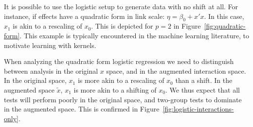 \documentclass[]{bio}
\begin{document}
It is possible to use the logistic setup to generate data with no shift at all. 
For instance, if effects have a quadratic form in link scale: $\eta=\beta_0+x'x$. 
In this case, $x_1$ is akin to a rescaling of $x_0$.
This is depicted for $p=2$ in Figure~\ref{fig:quadratic-form}.
This example is typically encountered in the machine learning literature, to motivate learning with kernels. 

When analyzing the quadratic form logistic regression we need to distinguish between analysis in the original $x$ space, and in the augmented interaction space. 
In the original space, $x_1$ is more akin to a rescaling of $x_0$ than a shift.
In the augmented space $\tilde{x}$, $x_1$ is more akin to a shifting of $x_0$. 
We thus expect that all tests will perform poorly in the original space, and two-group tests to dominate in the augmented space. 
This is confirmed in Figure~\ref{fig:logistic-interactions-only}.
\end{document}

